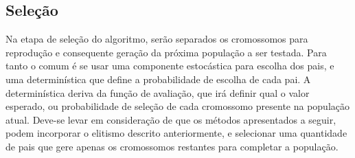 \subsection{Seleção}
\label{subsec:selecao}

Na etapa de seleção do algoritmo, serão separados os cromossomos para reprodução e consequente geração da próxima população a ser testada. Para tanto o comum é se usar uma componente estocástica para escolha dos pais, e uma determinística que define a probabilidade de escolha de cada pai. A determinística deriva da função de avaliação, que irá definir qual o valor esperado, ou probabilidade de seleção de cada cromossomo presente na população atual. Deve-se levar em consideração de que os métodos apresentados a seguir, podem incorporar o elitismo descrito anteriormente, e selecionar uma quantidade de pais que gere apenas os cromossomos restantes para completar a população.

